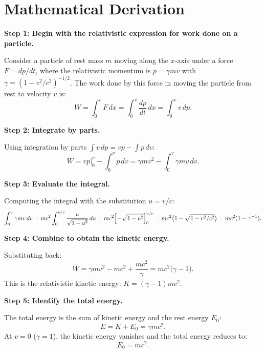\section*{Mathematical Derivation}

\textbf{Step 1: Begin with the relativistic expression for work done on a particle.}

Consider a particle of rest mass $m$ moving along the $x$-axis under a force $F = dp/dt$, where the relativistic momentum is $p = \gamma mv$ with $\gamma = (1-v^{2}/c^{2})^{-1/2}$. The work done by this force in moving the particle from rest to velocity $v$ is:
\begin{equation}
W = \int_{0}^{v} F\,dx = \int_{0}^{v} \frac{dp}{dt}\,dx = \int_{0}^{v} v\,dp.
\end{equation}

\textbf{Step 2: Integrate by parts.}

Using integration by parts $\int v\,dp = vp - \int p\,dv$:
\begin{equation}
W = vp\Big|_{0}^{v} - \int_{0}^{v} p\,dv = \gamma mv^{2} - \int_{0}^{v} \gamma mv\,dv.
\end{equation}

\textbf{Step 3: Evaluate the integral.}

Computing the integral with the substitution $u = v/c$:
\begin{equation}
\int_{0}^{v} \gamma mv\,dv = mc^{2}\int_{0}^{v/c} \frac{u}{\sqrt{1-u^{2}}}\,du = mc^{2}\Bigl[-\sqrt{1-u^{2}}\Bigr]_{0}^{v/c} = mc^{2}\bigl(1-\sqrt{1-v^{2}/c^{2}}\bigr) = mc^{2}(1-\gamma^{-1}).
\end{equation}

\textbf{Step 4: Combine to obtain the kinetic energy.}

Substituting back:
\begin{equation}
W = \gamma mv^{2} - mc^{2} + \frac{mc^{2}}{\gamma} = mc^{2}\bigl(\gamma - 1\bigr).
\end{equation}
This is the relativistic kinetic energy: $K = (\gamma - 1)mc^{2}$.

\textbf{Step 5: Identify the total energy.}

The total energy is the sum of kinetic energy and the rest energy $E_{0}$:
\begin{equation}
E = K + E_{0} = \gamma mc^{2}.
\end{equation}
At $v = 0$ ($\gamma = 1$), the kinetic energy vanishes and the total energy reduces to:
\begin{equation}
\boxed{E_{0} = mc^{2}.}
\end{equation}

